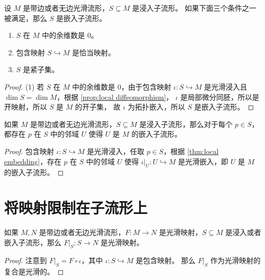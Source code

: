 \documentclass[fontset=none]{Notes}
\begin{document}
\begin{proposition}
  设 $M$ 是带边或者无边光滑流形，$S\subseteq M$ 是浸入子流形。
  如果下面三个条件之一被满足，那么 $S$ 是嵌入子流形。
  \begin{enumerate}
    \item $S$ 在 $M$ 中的余维数是 $0$。
    \item 包含映射 $S\hookrightarrow M$ 是恰当映射。
    \item $S$ 是紧子集。
  \end{enumerate}
\end{proposition}
\begin{proof}
  (1) 若 $S$ 在 $M$ 中的余维数是 $0$，由于包含映射 $\iota:S\hookrightarrow M$
  是光滑浸入且 $\dim S=\dim M$，根据 \autoref{prop:local diffeomorphism}，
  $\iota$ 是局部微分同胚，所以是开映射，所以 $S$ 是 $M$ 的开子集，
  故 $\iota$ 为拓扑嵌入，所以 $S$ 是嵌入子流形。
\end{proof}


\begin{proposition}[浸入子流形是局部的嵌入]
  如果 $M$ 是带边或者无边光滑流形，$S\subseteq M$ 是浸入子流形，那么对于每个
  $p\in S$，都存在 $p$ 在 $S$ 中的邻域 $U$ 使得 $U$ 是 $M$ 的嵌入子流形。
\end{proposition}
\begin{proof}
  包含映射 $\iota:S\hookrightarrow M$ 是光滑浸入，任取 $p\in S$，根据
  \autoref{thm:local embedding}，存在 $p$ 在 $S$ 中的邻域 $U$ 使得
  $\iota|_U:U\hookrightarrow M$ 是光滑嵌入，即 $U$ 是 $M$ 的嵌入子流形。
\end{proof}


\section{将映射限制在子流形上}

\begin{theorem}[光滑映射限制定义域]
  如果 $M,N$ 是带边或者无边光滑流形，$F:M\to N$ 是光滑映射，$S\subseteq M$
  是浸入或者嵌入子流形，那么 $F|_S:S\to N$ 是光滑映射。
\end{theorem}
\begin{proof}
  注意到 $F|_S=F\circ\iota$，其中 $\iota:S\hookrightarrow M$ 是包含映射。
  那么 $F|_S$ 作为光滑映射的复合是光滑的。
\end{proof}
\end{document}

